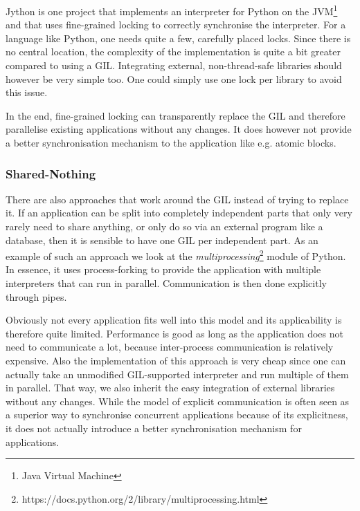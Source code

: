 \documentclass{sigplanconf}
\begin{document}
Jython\cite{webjython} is one project that implements an
interpreter for Python on the JVM\footnote{Java Virtual Machine} and
that uses fine-grained locking to correctly synchronise the
interpreter. For a language like Python, one needs quite a few,
carefully placed locks. Since there is no central location, the
complexity of the implementation is quite a bit greater compared to
using a GIL. Integrating external, non-thread-safe libraries should
however be very simple too. One could simply use one lock per library
to avoid this issue.

In the end, fine-grained locking can transparently replace the GIL
and therefore parallelise existing applications without any
changes. It does however not provide a better synchronisation
mechanism to the application like e.g. atomic blocks.


\subsubsection{Shared-Nothing}

There are also approaches that work around the GIL instead of trying
to replace it. If an application can be split into completely
independent parts that only very rarely need to share anything, or
only do so via an external program like a database, then it is
sensible to have one GIL per independent part. As an example of such
an approach we look at the
\emph{multiprocessing}\footnote{https://docs.python.org/2/library/multiprocessing.html}
module of Python. In essence, it uses process-forking to provide the
application with multiple interpreters that can run in parallel.
Communication is then done explicitly through pipes.

Obviously not every application fits well into this model and its
applicability is therefore quite limited. Performance is good as
long as the application does not need to communicate a lot, because
inter-process communication is relatively expensive. Also the
implementation of this approach is very cheap since one can
actually take an unmodified GIL-supported interpreter and run
multiple of them in parallel. That way, we also inherit the
easy integration of external libraries without any changes.
While the model of explicit communication is often seen as a
superior way to synchronise concurrent applications because
of its explicitness, it does not actually introduce a better
synchronisation mechanism for applications.
\end{document}
